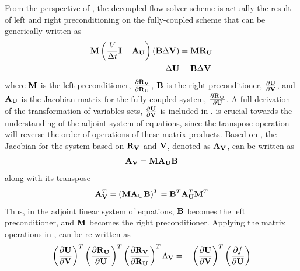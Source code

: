 From the perspective of , the decoupled flow solver scheme
is actually the result of left and right preconditioning on the fully-coupled
scheme that can be generically written as
\begin{equation}
  \begin{aligned}
    \mathbf M \left(\frac{V}{\Delta t} \mathbf I + \mathbf A_{\mathbf U} \right) 
    \left( \mathbf B \Delta \mathbf V \right) &= \mathbf M \mathbf R_{{\mathbf U}_{}} \\
    \Delta \mathbf U &= \mathbf B \Delta \mathbf V
  \end{aligned}
  \label{generic-fc-to-dc}
\end{equation}
where $\mathbf M$ is the left preconditioner, $\frac{\partial \mathbf R_{{\mathbf V}_{}}}{\partial \mathbf R_{{\mathbf U}_{}}}$, $\mathbf B$ is the right
preconditioner, $\frac{\partial \mathbf U}{\partial \mathbf V}$, and $\mathbf A_{\mathbf U}$ is the Jacobian matrix for the
fully coupled system, $\frac{\partial \mathbf R_{{\mathbf U}_{}}}{\partial \mathbf U}$.  A full derivation of the
transformation of variables sets, $\frac{\partial \mathbf U}{\partial \mathbf V}$ is included in
.  is crucial towards the
understanding of the adjoint system of equations, since the transpose operation
will reverse the order of operations of these matrix products.  Based on
, the Jacobian for the system based on $\mathbf R_{{\mathbf V}_{}}$ and $\mathbf V$,
denoted as $\mathbf A_{\mathbf V}$, can be written as
\begin{equation}
  \mathbf A_{\mathbf V} = \mathbf M \mathbf A_{\mathbf U} \mathbf B
  \label{adj-dc-generic}
\end{equation}
along with its transpose
\begin{equation}
  \mathbf A_{\mathbf V}^{T}
   = \left( \mathbf M \mathbf A_{\mathbf U} \mathbf B \right)^{T}
   = \mathbf B^{T} \mathbf A_{\mathbf U}^{T} \mathbf M^{T}
  \label{adj-dc-generic-transpose}
\end{equation}
Thus, in the adjoint linear system of equations, $\mathbf B$ becomes the left
preconditioner, and $\mathbf M$ becomes the right preconditioner.  Applying the matrix
operations in ,  can be re-written as
\begin{equation}
  \left( \frac{\partial \mathbf U}{\partial \mathbf V} \right)^{T}
  \left(\frac{\partial \mathbf R_{{\mathbf U}_{}}}{\partial \mathbf U} \right)^{T} 
  \left( \frac{\partial \mathbf R_{{\mathbf V}_{}}}{\partial \mathbf R_{{\mathbf U}_{}}} \right)^{T}
  \Lambda_{\mathbf V} 
  = 
  - \left( \frac{\partial \mathbf U}{\partial \mathbf V} \right)^{T}
  \left( \frac{\partial f}{\partial \mathbf U} \right)
  \label{adj-u-to-v}
\end{equation}
